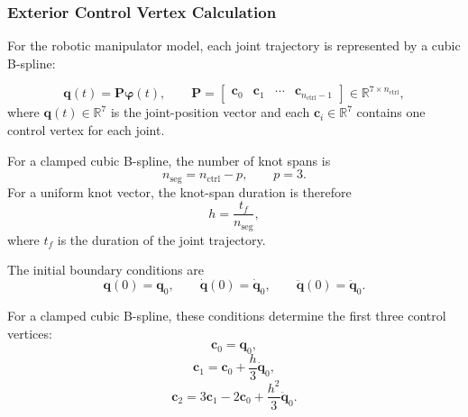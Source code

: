 \subsubsection{Exterior Control Vertex Calculation}

For the robotic manipulator model, each joint trajectory is represented by a cubic B-spline:

\begin{equation}
    \mathbf{q}(t)
    =
    \mathbf{P}\boldsymbol{\varphi}(t),
    \qquad
    \mathbf{P}
    =
    \begin{bmatrix}
        \mathbf{c}_0 &
        \mathbf{c}_1 &
        \cdots &
        \mathbf{c}_{n_{\mathrm{ctrl}}-1}
    \end{bmatrix}
    \in
    \mathbb{R}^{7\times n_{\mathrm{ctrl}}},
\end{equation}
where $\mathbf{q}(t)\in\mathbb{R}^7$ is the joint-position vector and each $\mathbf{c}_i\in\mathbb{R}^7$ contains one control vertex for each joint.

For a clamped cubic B-spline, the number of knot spans is
\begin{equation}
    n_{\mathrm{seg}}
    =
    n_{\mathrm{ctrl}}-p,
    \qquad
    p=3.
\end{equation}
For a uniform knot vector, the knot-span duration is therefore
\begin{equation}
    h
    =
    \frac{t_f}{n_{\mathrm{seg}}},
\end{equation}
where $t_f$ is the duration of the joint trajectory.

The initial boundary conditions are
\begin{equation}
    \mathbf{q}(0)=\mathbf{q}_0,
    \qquad
    \dot{\mathbf{q}}(0)=\dot{\mathbf{q}}_0,
    \qquad
    \ddot{\mathbf{q}}(0)=\ddot{\mathbf{q}}_0.
\end{equation}

For a clamped cubic B-spline, these conditions determine the first
three control vertices:
\begin{equation}
    \mathbf{c}_0
    =
    \mathbf{q}_0,
\end{equation}
\begin{equation}
    \mathbf{c}_1
    =
    \mathbf{c}_0
    +
    \frac{h}{3}\dot{\mathbf{q}}_0,
\end{equation}
\begin{equation}
    \mathbf{c}_2
    =
    3\mathbf{c}_1
    -
    2\mathbf{c}_0
    +
    \frac{h^2}{3}\ddot{\mathbf{q}}_0.
\end{equation}

